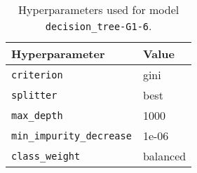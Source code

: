 \begin{table}[H]
\centering
\capstart
\begin{tabularx}{0.48\textwidth}{|X|l|}
\hline
Hyperparameter & Value \\
\hline
\texttt{criterion} & gini \\
\texttt{splitter} & best \\
\texttt{max\_depth} & 1000 \\
\texttt{min\_impurity\_decrease} & 1e-06 \\
\texttt{class\_weight} & balanced \\
\hline
\end{tabularx}
\caption{Hyperparameters used for model \texttt{decision\_tree-G1-6}.}
\label{tab:hyperparameters_best_decision_tree}

\end{table}
